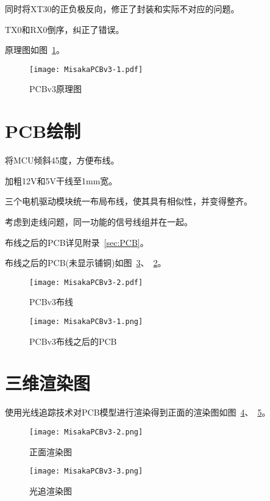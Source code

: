 同时将XT30的正负极反向，修正了封装和实际不对应的问题。

TX0和RX0倒序，纠正了错误。

原理图如图~\ref{fig:MisakaPCBv3-sch}。

\begin{figure}[htbp]
    \centering
    \texttt{[image: MisakaPCBv3-1.pdf]}
    \caption{PCBv3原理图}
    \label{fig:MisakaPCBv3-sch}
\end{figure}

\section{PCB绘制}

将MCU倾斜45度，方便布线。

加粗12V和5V干线至1mm宽。

三个电机驱动模块统一布局布线，使其具有相似性，并变得整齐。

考虑到走线问题，同一功能的信号线组并在一起。

布线之后的PCB详见附录~\ref{sec:PCB}。

布线之后的PCB(未显示铺铜)如图~\ref{fig:MisakaPCBv3-1}、~\ref{fig:MisakaPCBv3}。

\begin{figure}[htbp]
    \centering
    \texttt{[image: MisakaPCBv3-2.pdf]}
    \caption{PCBv3布线}
    \label{fig:MisakaPCBv3}
\end{figure}

\begin{figure}[htbp]
    \centering
    \texttt{[image: MisakaPCBv3-1.png]}
    \caption{PCBv3布线之后的PCB}
    \label{fig:MisakaPCBv3-1}
\end{figure}

\section{三维渲染图}

使用光线追踪技术对PCB模型进行渲染得到正面的渲染图如图~\ref{fig:MisakaPCBv3-2}、~\ref{fig:MisakaPCBv3-3}。

\begin{figure}[htbp]
    \centering
    \texttt{[image: MisakaPCBv3-2.png]}
    \caption{正面渲染图}
    \label{fig:MisakaPCBv3-2}
\end{figure}

\begin{figure}[htbp]
    \centering
    \texttt{[image: MisakaPCBv3-3.png]}
    \caption{光追渲染图}
    \label{fig:MisakaPCBv3-3}
\end{figure}
